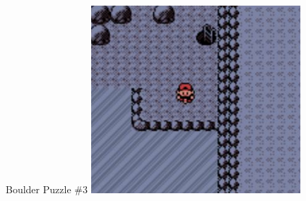 \begin{paracol}{2}
\begin{story}{Boulder Puzzle \#3}
	\varwb
	\includegraphics{../Graphics/16. Boulder Puzzle 3.png}
	\varwe
\end{story}

\end{paracol}
\vspace{3.5mm}